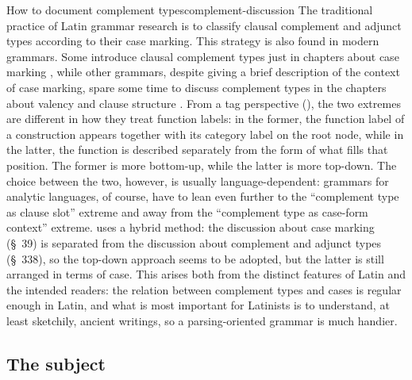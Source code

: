 \documentclass[a4paper, oneside]{report}
\newcommand*{\citesec}[1]{\S~{#1}}
\newcommand*{\citechap}[1]{chap.~{#1}}
\begin{document}
\begin{infobox}{How to document complement types}{complement-discussion}
    The traditional practice of Latin grammar research
    is to classify clausal complement and adjunct types according to their case marking.
    This strategy is also found in modern grammars.
    Some introduce clausal complement types just in chapters about case marking 
    \citep[\citechap{8}]{jacques2021grammar},
    while other grammars, despite giving a brief description of the context of case marking,
    spare some time to discuss complement types in the chapters about valency and clause structure 
    \citep[\citesec{3.4}, \citechap{19}, \citechap{22}]{forker2020grammar}.
    From a \ac{tag} perspective (), 
    the two extremes are different in how they treat function labels:
    in the former, the function label of a construction appears together with its category label on the root node,
    while in the latter, the function is described separately from the form of what fills that position.
    The former is more bottom-up, 
    while the latter is more top-down.
    The choice between the two, however, is usually language-dependent:
    grammars for analytic languages, of course, have to lean even further to the 
    ``complement type as clause slot'' extreme 
    and away from the ``complement type as case-form context'' extreme.
    \citet{allen1903allen} uses a hybrid method:
    the discussion about case marking (\citesec{39}) is separated from 
    the discussion about complement and adjunct types (\citesec{338}),
    so the top-down approach seems to be adopted,
    but the latter is still arranged in terms of case.
    This arises both from the distinct features of Latin and the intended readers:
    the relation between complement types and cases is regular enough in Latin,
    and what is most important for Latinists is to understand, at least sketchily, ancient writings, 
    so a parsing-oriented grammar is much handier.
\end{infobox}

\subsection{The subject}
\end{document}
